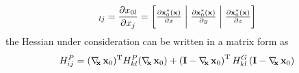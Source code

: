 \begin{equation}
[\Dx \vxo]_{lj} =  \frac{\partial x_{0 l}	}{\partial x_j} =  
\begin{bmatrix} \frac{\partial \vxo^*(\vx)}{\partial x} \hspace{1mm} \bigg| & \hspace{-2.5mm}  \frac{\partial \vxo^*(\vx)}{ \partial y} \hspace{1mm} \bigg| & \hspace{-2.5mm} \frac{\partial \vxo^*(\vx)}{ \partial z} 
 \\[.3em] \end{bmatrix}
\end{equation}
the Hessian under consideration can be written in a matrix form as
\begin{equation}
\label{eq:app:Hpij}
H_{ij}^P = (\Dx \vxo)^{\mathrm{T}}  H_{kl}^P (\Dx \vxo) + \left( \mathbf{I} - \Dx \vxo \right)^{\mathrm{T}} H^G_{kl} \left( \mathbf{I} - \Dx \vxo \right) \\ 
\end{equation}

